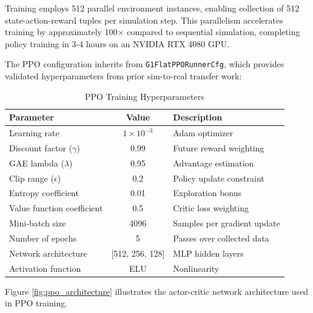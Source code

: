 \documentclass[12pt,a4paper]{article}
\begin{document}
Training employs 512 parallel environment instances, enabling collection of 512 state-action-reward tuples per simulation step. This parallelism accelerates training by approximately 100$\times$ compared to sequential simulation, completing policy training in 3-4 hours on an NVIDIA RTX 4080 GPU.

The PPO configuration inherits from \texttt{G1FlatPPORunnerCfg}, which provides validated hyperparameters from prior sim-to-real transfer work:

\begin{table}[H]
\centering
\caption{PPO Training Hyperparameters}
\label{tab:ppo_config}
\footnotesize
\begin{tabular}{l|c|l}
\hline
\textbf{Parameter} & \textbf{Value} & \textbf{Description} \\
\hline
\hline
Learning rate & $1 \times 10^{-3}$ & Adam optimizer \\
\hline
Discount factor ($\gamma$) & 0.99 & Future reward weighting \\
\hline
GAE lambda ($\lambda$) & 0.95 & Advantage estimation \\
\hline
Clip range ($\epsilon$) & 0.2 & Policy update constraint \\
\hline
Entropy coefficient & 0.01 & Exploration bonus \\
\hline
Value function coefficient & 0.5 & Critic loss weighting \\
\hline
Mini-batch size & 4096 & Samples per gradient update \\
\hline
Number of epochs & 5 & Passes over collected data \\
\hline
Network architecture & [512, 256, 128] & MLP hidden layers \\
\hline
Activation function & ELU & Nonlinearity \\
\hline
\end{tabular}
\end{table}

Figure \ref{fig:ppo_architecture} illustrates the actor-critic network architecture used in PPO training.
\end{document}
